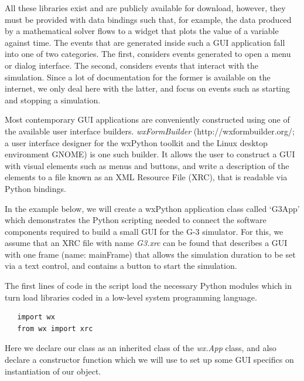 \documentclass[12pt]{article}
\begin{document}
All these libraries exist and are publicly available for download,
however, they must be provided with data bindings such that, for
example, the data produced by a mathematical solver flows to a widget
that plots the value of a variable against time.  The events that are
generated inside such a GUI application fall into one of two
categories.  The first, considers events generated to open a menu or
dialog interface.  The second, considers events that interact with the
simulation.  Since a lot of documentation for the former is available
on the internet, we only deal here with the latter, and focus on
events such as starting and stopping a simulation.

Most contemporary GUI applications are conveniently constructed using
one of the available user interface builders.  {\it wxFormBuilder}
(http://wxformbuilder.org/; a user interface designer for the wxPython
toolkit and the Linux desktop environment GNOME) is one such builder.
It allows the user to construct a GUI with visual elements such as
menus and buttons, and write a description of the elements to a file 
known as an XML Resource File (XRC), that is readable via Python bindings.



In the example below, we will create a wxPython application class 
called `G3App' which demonstrates the Python scripting needed to 
connect the software components required to build a small GUI for 
the G-3 simulator.  For this, we assume that an XRC file with name
{\it G3.xrc} can be found that describes a GUI with one frame (name:
mainFrame) that allows the simulation duration to be set via a
text control, and contains a button to start the simulation.

The first lines of code in the script load the necessary Python
modules which in turn load libraries coded in a low-level system
programming language.

{\footnotesize
  \resetlinenumber
  \linenumbers
\begin{verbatim}
   import wx
   from wx import xrc
\end{verbatim}
}

Here we declare our class as an inherited class of the {\it wx.App} class, 
and also declare a constructor function which we will use to set up 
some GUI specifics on instantiation of our object.
\end{document}
